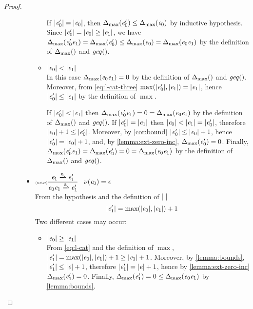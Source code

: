 \begin{proof}
\begin{description}
\begin{itemize}
\begin{itemize}
                 If ${\mid}{\mathit {e}_0'}{\mid}={\mid}{\mathit {e}_0}{\mid}$, then ${\Delta_{\max}}({\mathit {e}_0'})\leq{\Delta_{\max}}({\mathit {e}_0})$ by inductive hypothesis. Since ${\mid}{\mathit {e}_0'}{\mid}={\mid}{\mathit {e}_0}{\mid}\geq{\mid}{\ensuremath{\mathit {e}}_1}{\mid}$, we have ${\Delta_{\max}}({\mathit {e}_0'\mathit {e}_1})={\Delta_{\max}}({\mathit {e}_0'})\leq{\Delta_{\max}}({\mathit {e}_0})={\Delta_{\max}}({\mathit {e}_0\mathit {e}_1})$ by the definition of ${\Delta_{\max}}({})$ and $\mathit{geq}()$.
           \item ${\mid}{\mathit {e}_0}{\mid}<{\mid}{\mathit {e}_1}{\mid}$\\
                 In this case ${\Delta_{\max}}({\mathit {e}_0\mathit {e}_1})=0$ by the definition of ${\Delta_{\max}}({})$ and $\mathit{geq}()$. Moreover, from \cref{eq:l-cat-three} $\max({\mid}{\mathit {e}_0'}{\mid},{\mid}{\mathit {e}_1}{\mid})={\mid}{\mathit {e}_1}{\mid}$, hence ${\mid}{\mathit {e}_0'}{\mid}\leq{\mid}{\ensuremath{\mathit {e}}_1}{\mid}$ by the definition of $\max$.

                 If ${\mid}{\mathit {e}_0'}{\mid}<{\mid}{\mathit {e}_1}{\mid}$ then ${\Delta_{\max}}({\mathit {e}_0'\mathit {e}_1})=0={\Delta_{\max}}({\mathit {e}_0\mathit {e}_1})$ by the definition of ${\Delta_{\max}}({})$ and $\mathit{geq}()$. If ${\mid}{\mathit {e}_0'}{\mid}={\mid}{\mathit {e}_1}{\mid}$ then ${\mid}{\mathit {e}_0}{\mid}<{\mid}{\mathit {e}_1}{\mid}={\mid}{\mathit {e}_0'}{\mid}$, therefore ${\mid}{\mathit {e}_0}{\mid}+1\leq{\mid}{\ensuremath{\mathit {e}}_0'}{\mid}$. Moreover, by \cref{cor:bound} ${\mid}{\mathit {e}'_0}{\mid}\leq{\mid}{\ensuremath{\mathit {e}}_0}{\mid}+1$, hence ${\mid}{\mathit {e}_0'}{\mid}={\mid}{\mathit {e}_0}{\mid}+1$, and, by \cref{lemma:ext-zero-inc}, ${\Delta_{\max}}({\mathit {e}_0'})=0$. Finally,
                 ${\Delta_{\max}}({\mathit {e}_0'\mathit {e}_1})={\Delta_{\max}}({\mathit {e}_0'})=0={\Delta_{\max}}({\mathit {e}_0\mathit {e}_1})$ by the definition of ${\Delta_{\max}}({})$ and $\mathit{geq}()$.
          \end{itemize}

    \item $\Rule{r-cat}{\re_1\parDer{\sym}\re'_1}{\re_0\catop\re_1\parDer{\sym}\re'_1}{\hasEps{\re_0}=\eps}$\\[2ex]
          From the hypothesis and the definition of ${\mid}{\ }{\mid}$
          \begin{equation}
           \label{eq:l-cat}
           {\mid}{\ensuremath{\mathit {e}}_1'}{\mid}=\max({\mid}{\mathit {e}_0}{\mid},{\mid}{\mathit {e}_1}{\mid})+1
          \end{equation}
          Two different cases may occur:
          \begin{itemize}
           \item ${\mid}{\mathit {e}_0}{\mid}\geq{\mid}{\ensuremath{\mathit {e}}_1}{\mid}$\\
                 From \cref{eq:l-cat} and the definition of $\max$, ${\mid}{\mathit {e}_1'}{\mid}=\max({\mid}{\mathit {e}_0}{\mid},{\mid}{\mathit {e}_1}{\mid})+1\geq{\mid}{\ensuremath{\mathit {e}}_1}{\mid}+1$. Moreover, by \cref{lemma:bounds},
                 ${\mid}{\mathit {e}_1'}{\mid}\leq{\mid}{\ensuremath{\mathit {e}}}{\mid}+1$, therefore ${\mid}{\mathit {e}_1'}{\mid}={\mid}{\mathit {e}}{\mid}+1$, hence by \cref{lemma:ext-zero-inc} ${\Delta_{\max}}({\mathit {e}_1'})=0$.
                 Finally, ${\Delta_{\max}}({\mathit {e}_1'})=0\leq{\Delta_{\max}}({\mathit {e}_0\mathit {e}_1})$ by \cref{lemma:bounds}.


\end{itemize}
\end{itemize}
\end{description}
\end{proof}
